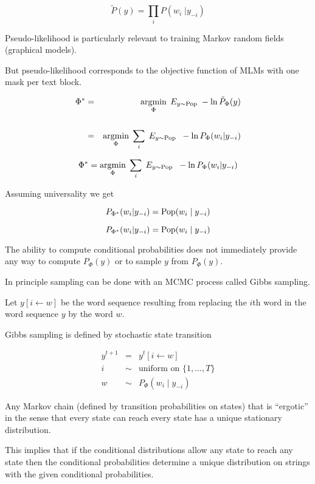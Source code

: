 {
$$\tilde{P}(y) = \prod_i P(w_i\;|y_{-i})$$

\vfill
Pseudo-likelihood is particularly relevant to training Markov random fields (graphical models).

\vfill
But pseudo-likelihood corresponds to the objective function of MLMs with one mask per text block.

\begin{eqnarray*}
\Phi^* & = & \operatorname*{argmin}_\Phi\; E_{y \sim \mathrm{Pop}}\;-\ln \tilde{P}_\Phi(y) \\
\\
& = & \operatorname*{argmin}_\Phi\; \sum_i\; E_{y \sim \mathrm{Pop}}\;\;-\ln P_\Phi(w_i|y_{-i})
\end{eqnarray*}


$$\Phi^* = \operatorname*{argmin}_\Phi\; \sum_i \; E_{y \sim \mathrm{Pop}}\;\;-\ln P_\Phi(w_i|y_{-i})$$

\vfill
Assuming universality we get

$$P_{\Phi^*}(w_i|y_{-i}) = \mathrm{Pop}(w_i\;|\;y_{-i})$$

$$P_{\Phi^*}(w_i|y_{-i}) = \mathrm{Pop}(w_i\;|\;y_{-i})$$

\vfill
The ability to compute conditional probabilities does not immediately provide any way to compute $P_\Phi(y)$ or to sample $y$ from $P_\Phi(y)$.

\vfill
In principle sampling can be done with an MCMC process called Gibbs sampling.


Let $y[i\leftarrow w]$ be the word sequence resulting from replacing the $i$th word in the word sequence $y$ by the word $w$.


\vfill
Gibbs sampling is defined by stochastic state transition

\begin{eqnarray*}
y^{t+1} & = & y^t[i\leftarrow w] \\
i & \sim & \mbox{uniform on $\{1,\ldots,T\}$} \\
w & \sim & P_\Phi(w_i\;|\;y_{-i})
\end{eqnarray*}


Any Markov chain (defined by transition probabilities on states) that is ``ergotic'' in the sense that every state can reach every state has a unique stationary distribution.

\vfill
This implies that if the conditional distributions allow any state to reach any state then the conditional probabilities determine a unique distribution on
strings with the given conditional probabilities.

}
